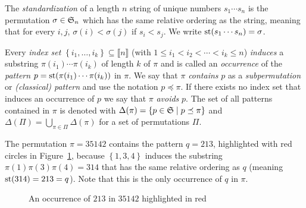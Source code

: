 \begin{definition}
  The \emph{standardization} of a length $n$ string of unique numbers $s_1 
  \cdots s_n$ is the permutation $\sigma \in \S_n$ which has the same relative 
  ordering as the string, meaning that for every $i, j$, $\sigma(i) < \sigma(j)$ 
  if $s_i < s_j$. We write $\st(s_1 \cdots s_n) = \sigma$.
\end{definition}

Every \emph{index set} $\left\{ i_1, \ldots, i_k \right\} \subseteq \llbracket n 
\rrbracket$ (with $1 \leq i_1 < i_2 < \cdots < i_k \leq n$) \emph{induces} a 
substring $\pi(i_1)\cdots\pi(i_k)$ of length $k$ of $\pi$ and is called an 
\emph{occurrence} of the \emph{pattern} $p = \st(\pi(i_1)\cdots\pi(i_k))$ in 
$\pi$. We say that $\pi$ \emph{contains} $p$ as a \emph{subpermutation} or 
\emph{(classical) pattern} and use the notation $p \preceq \pi$. If there exists 
no index set that induces an occurrence of $p$ we say that $\pi$ \emph{avoids} 
$p$. The set of all patterns contained in $\pi$ is denoted with $\Delta(\pi) = 
\left\{ p \in \S \mid p \preceq \pi \right\}$ and $\Delta(\Pi) = \bigcup_{\pi 
\in \Pi}{\Delta(\pi)}$ for a set of permutations $\Pi$.


\begin{example}
  The permutation $\pi = 35142$ contains the pattern $q = 213$, highlighted with 
  red circles in Figure~\ref{figure:q in pi}, because $\left\{ 1, 3, 4 \right\}$ 
  induces the substring $\pi(1)\pi(3)\pi(4)= 314$ that has the same relative 
  ordering as $q$ (meaning $\st(314) = 213 = q$). Note that this is the only 
  occurrence of $q$ in $\pi$. 
  \label{example:q in pi}

  \begin{figure}[htbp]
    \center
    \caption{An occurrence of $213$ in $35142$ highlighted in red}
    \label{figure:q in pi}
  \end{figure}
\end{example}

